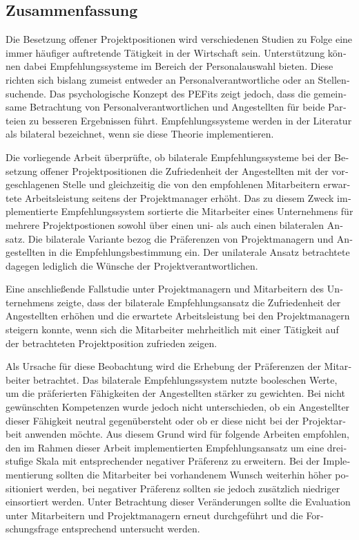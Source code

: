 \begin{otherlanguage}{ngerman}
\chapter*{Zusammenfassung}
Die Besetzung offener Projektpositionen wird verschiedenen Studien zu Folge eine immer häufiger auftretende Tätigkeit in der Wirtschaft sein. Unterstützung können dabei Empfehlungssysteme im Bereich der Personalauswahl bieten. Diese richten sich bislang zumeist entweder an Personalverantwortliche oder an Stellensuchende. Das psychologische Konzept des \aclp{PEFit} zeigt jedoch, dass die gemeinsame Betrachtung von Personalverantwortlichen und Angestellten für beide Parteien zu besseren Ergebnissen führt. Empfehlungssysteme werden in der Literatur als bilateral bezeichnet, wenn sie diese Theorie implementieren.

Die vorliegende Arbeit überprüfte, ob bilaterale Empfehlungssysteme bei der Besetzung offener Projektpositionen die Zufriedenheit der Angestellten mit der vorgeschlagenen Stelle und gleichzeitig die von den empfohlenen Mitarbeitern erwartete Arbeitsleistung seitens der Projektmanager erhöht. Das zu diesem Zweck implementierte Empfehlungssystem sortierte die Mitarbeiter eines Unternehmens für mehrere Projektpostionen sowohl über einen uni- als auch einen bilateralen Ansatz. Die bilaterale Variante bezog die Präferenzen von Projektmanagern und Angestellten in die Empfehlungsbestimmung ein. Der unilaterale Ansatz betrachtete dagegen lediglich die Wünsche der Projektverantwortlichen.

Eine anschließende Fallstudie unter Projektmanagern und Mitarbeitern des Unternehmens zeigte, dass der bilaterale Empfehlungsansatz die Zufriedenheit der Angestellten erhöhen und die erwartete Arbeitsleistung bei den Projektmanagern steigern konnte, wenn sich die Mitarbeiter mehrheitlich mit einer Tätigkeit auf der betrachteten Projektposition zufrieden zeigen.

Als Ursache für diese Beobachtung wird die Erhebung der Präferenzen der Mitarbeiter betrachtet. Das bilaterale Empfehlungssystem nutzte booleschen Werte, um die präferierten Fähigkeiten der Angestellten stärker zu gewichten. Bei nicht gewünschten Kompetenzen wurde jedoch nicht unterschieden, ob ein Angestellter dieser Fähigkeit neutral gegenübersteht oder ob er diese nicht bei der Projektarbeit anwenden möchte. Aus diesem Grund wird für folgende Arbeiten empfohlen, den im Rahmen dieser Arbeit implementierten Empfehlungsansatz um eine dreistufige Skala mit entsprechender negativer Präferenz zu erweitern. Bei der Implementierung sollten die Mitarbeiter bei vorhandenem Wunsch weiterhin höher positioniert werden, bei negativer Präferenz sollten sie jedoch zusätzlich niedriger einsortiert werden. Unter Betrachtung dieser Veränderungen sollte die Evaluation unter Mitarbeitern und Projektmanagern erneut durchgeführt und die Forschungsfrage entsprechend untersucht werden.
\end{otherlanguage}
